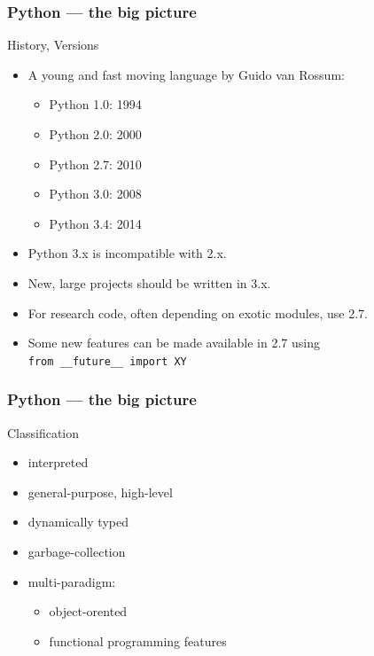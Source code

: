 \documentclass[xcolor=pdftex,dvipsnames,table]{beamer}
\begin{document}
\begin{frame}
  \frametitle{Python --- the big picture}
  \begin{block}{History, Versions}
    \begin{itemize}
      \item A young and fast moving language by Guido van Rossum:\\
        \begin{itemize}
          \item Python 1.0: 1994
          \item Python 2.0: 2000
          \item<+-|alert@2> Python 2.7: 2010
          \item Python 3.0: 2008
          \item Python 3.4: 2014
        \end{itemize}
      \item<2-> Python 3.x is incompatible with 2.x.
      \item<2-> New, large projects should be written in 3.x.
      \item<2-> For research code, often depending on exotic modules, use 2.7.
      \item<2-> Some new features can be made available in 2.7 using\\ \texttt{from \_\_future\_\_ import XY}
    \end{itemize}
  \end{block}
\end{frame}

\begin{frame}
  \frametitle{Python --- the big picture}
  \begin{block}{Classification}
    \begin{itemize}[<+->]
    \item interpreted
    \item general-purpose, high-level
    \item dynamically typed
    \item garbage-collection
    \item multi-paradigm:
      \begin{itemize}[<+->]
          \item object-orented
          \item functional programming features
        \end{itemize}
    \end{itemize}
  \end{block}
\end{frame}
\end{document}
